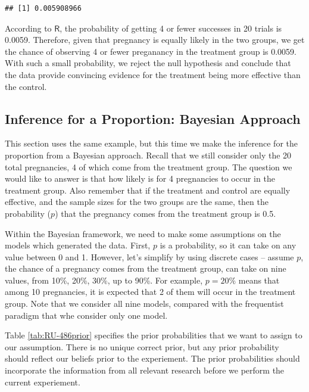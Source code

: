\documentclass[]{book}
\theoremstyle{definition}
\theoremstyle{definition}
\theoremstyle{definition}
\theoremstyle{remark}
\begin{document}
\begin{verbatim}
## [1] 0.005908966
\end{verbatim}

According to \(\mathsf{R}\), the probability of getting 4 or fewer
successes in 20 trials is 0.0059. Therefore, given that pregnancy is
equally likely in the two groups, we get the chance of observing 4 or
fewer preganancy in the treatment group is 0.0059. With such a small
probability, we reject the null hypothesis and conclude that the data
provide convincing evidence for the treatment being more effective than
the control.

\subsection{Inference for a Proportion: Bayesian
Approach}\label{inference-for-a-proportion-bayesian-approach}

This section uses the same example, but this time we make the inference
for the proportion from a Bayesian approach. Recall that we still
consider only the 20 total pregnancies, 4 of which come from the
treatment group. The question we would like to answer is that how likely
is for 4 pregnancies to occur in the treatment group. Also remember that
if the treatment and control are equally effective, and the sample sizes
for the two groups are the same, then the probability (\(p\)) that the
pregnancy comes from the treatment group is 0.5.

Within the Bayesian framework, we need to make some assumptions on the
models which generated the data. First, \(p\) is a probability, so it
can take on any value between 0 and 1. However, let's simplify by using
discrete cases -- assume \(p\), the chance of a pregnancy comes from the
treatment group, can take on nine values, from 10\%, 20\%, 30\%, up to
90\%. For example, \(p = 20\%\) means that among 10 pregnancies, it is
expected that 2 of them will occur in the treatment group. Note that we
consider all nine models, compared with the frequentist paradigm that
whe consider only one model.

Table \ref{tab:RU-486prior} specifies the prior probabilities that we
want to assign to our assumption. There is no unique correct prior, but
any prior probability should reflect our beliefs prior to the
experiement. The prior probabilities should incorporate the information
from all relevant research before we perform the current experiement.
\end{document}
